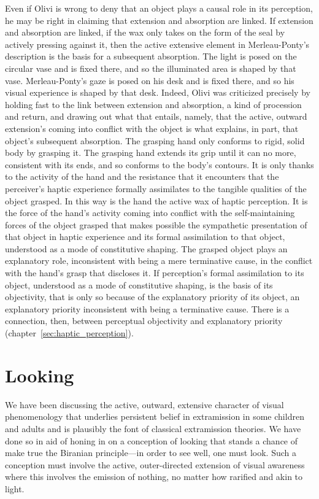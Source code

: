 Even if Olivi is wrong to deny that an object plays a causal role in its perception, he may be right in claiming that extension and absorption are linked. If extension and absorption are linked, if the wax only takes on the form of the seal by actively pressing against it, then the active extensive element in Merleau-Ponty's description is the basis for a subsequent absorption. The light is posed on the circular vase and is fixed there, and so the illuminated area is shaped by that vase. Merleau-Ponty's gaze is posed on his desk and is fixed there, and so his visual experience is shaped by that desk. Indeed, Olivi was criticized precisely by holding fast to the link between extension and absorption, a kind of procession and return, and drawing out what that entails, namely, that the active, outward extension's coming into conflict with the object is what explains, in part, that object's subsequent absorption. The grasping hand only conforms to rigid, solid body by grasping it. The grasping hand extends its grip until it can no more, consistent with its ends, and so conforms to the body's contours. It is only thanks to the activity of the hand and the resistance that it encounters that the perceiver's haptic experience formally assimilates to the tangible qualities of the object grasped. In this way is the hand the active wax of haptic perception. It is the force of the hand's activity coming into conflict with the self-maintaining forces of the object grasped that makes possible the sympathetic presentation of that object in haptic experience and its formal assimilation to that object, understood as a mode of constitutive shaping. The grasped object plays an explanatory role, inconsistent with being a mere terminative cause, in the conflict with the hand's grasp that discloses it. If perception's formal assimilation to its object, understood as a mode of constitutive shaping, is the basis of its objectivity, that is only so because of the explanatory priority of its object, an explanatory priority inconsistent with being a terminative cause. There is a connection, then, between perceptual objectivity and explanatory priority (chapter~\ref{sec:haptic_perception}).


\section{Looking} %
\label{sec:looking}

We have been discussing the active, outward, extensive character of visual phenomenology that underlies persistent belief in extramission in some children and adults and is plausibly the font of classical extramission theories. We have done so in aid of honing in on a conception of looking that stands a chance of make true the Biranian principle---in order to see well, one must look. Such a conception must involve the active, outer-directed extension of visual awareness where this involves the emission of nothing, no matter how rarified and akin to light. 

